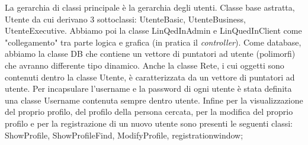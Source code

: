 \documentclass[openany, a4paper,11pt] {report}
\begin{document}
La gerarchia di classi principale è la gerarchia degli utenti. Classe base astratta, \textsf{Utente} da cui derivano 3 sottoclassi: \textsf{UtenteBasic}, \textsf{UtenteBusiness}, \textsf{UtenteExecutive}. Abbiamo poi la classe \textsf{LinQedInAdmin} e \textsf{LinQuedInClient} come "collegamento" tra parte logica e grafica (in pratica il \textsl{controller}). Come database, abbiamo la classe \textsf{DB} che contiene un vettore di puntatori ad utente (polimorfi) che avranno differente tipo dinamico. Anche la classe \textsf{Rete}, i cui oggetti sono contenuti dentro la classe Utente, è caratterizzata da un vettore di puntatori ad utente. Per incapsulare l'username e la password di ogni utente è stata definita una classe \textsf{Username} contenuta sempre dentro utente. Infine per la visualizzazione del proprio profilo, del profilo della persona cercata, per la modifica del proprio profilo e per la registrazione di un nuovo utente sono presenti le seguenti classi: \textsf{ShowProfile, ShowProfileFind, ModifyProfile, registrationwindow};
\\\\
\end{document}
